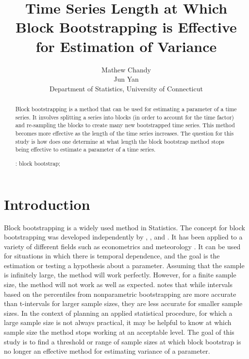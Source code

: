 \documentclass[12pt, letterpaper, titlepage]{article}
\title{Time Series Length at Which Block Bootstrapping is Effective for Estimation of Variance}
\author{Mathew Chandy\\
  Jun Yan\\[1ex]
  Department of Statistics, University of Connecticut\\
}
\date{}
\begin{document}
 
\maketitle

\doublespace

\begin{abstract}
Block bootstrapping is a method that can be used for estimating a parameter of a time
series. It involves splitting a series into blocks (in order to account for the time
factor) and re-sampling the blocks to create many new bootstrapped time series.
This method becomes more effective as the length of the time series increases. 
The question for this study is how does one determine at what length the block
bootstrap method stops being effective to estimate a parameter of a time
series.

\bigskip
\noindent{}:
block bootstrap;
\end{abstract}

\section{Introduction}
\label{sec:intro}

Block bootstrapping is a widely used method in Statistics. The concept for block 
bootstrapping was developed independently by \citet{hall1985resampling}, \citet{carlstein1986use}, and 
\citet{kunsch1989jackknife}. \citet{radovanov2014comparison} It has been applied to a variety of 
different fields such 
as econometrics \citep{mackinnon2006bootstrap} and meteorology \citep{varga2017generalised}. It can be used for 
situations in which there is temporal dependence, and the goal is the estimation or testing a hypothesis about a parameter. Assuming that the sample is infinitely 
large, the method will work perfectly. However, for a finite sample size, the method will 
not work as well as expected. \citet{hesterberg2015teachers} notes that while intervals based on the percentiles from nonparametric bootstrapping are more accurate than t-intervals for larger sample sizes, they are less accurate for smaller sample sizes. In the context of planning an applied 
statistical procedure, for which a large sample size is not always practical, it may be helpful to know at which sample size the method stops working at an acceptable level. 
The goal of this study is to find a threshold or range of sample sizes at which block bootstrap 
is no longer an effective method for estimating variance of a parameter.
\end{document}
